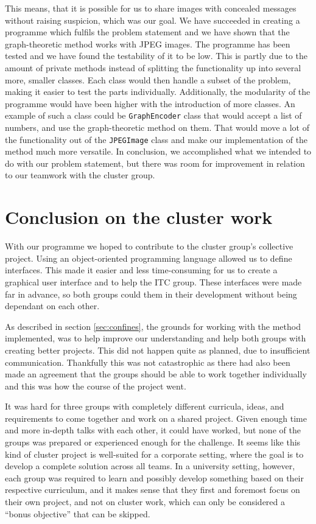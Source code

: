 This means, that it is possible for us to share images with concealed messages without raising suspicion, which was our goal.
We have succeeded in creating a programme which fulfils the problem statement and we have shown that the graph-theoretic method works with JPEG images. 
The programme has been tested and we have found the testability of it to be low. 
This is partly due to the amount of private methods instead of splitting the functionality up into several more, smaller classes. 
Each class would then handle a subset of the problem, making it easier to test the parts individually. 
Additionally, the modularity of the programme would have been higher with the introduction of more classes.
An example of such a class could be \lstinline|GraphEncoder| class that would accept a list of numbers, and use the graph-theoretic method on them. 
That would move a lot of the functionality out of the \lstinline|JPEGImage| class and make our implementation of the method much more versatile. 
In conclusion, we accomplished what we intended to do with our problem statement, but there was room for improvement in relation to our teamwork with the cluster group. 

\section{Conclusion on the cluster work}

With our programme we hoped to contribute to the cluster group's collective project.
Using an object-oriented programming language allowed us to define interfaces. This made it easier and less time-consuming for us to create a graphical user interface and to help the ITC group.
These interfaces were made far in advance, so both groups could them in their development without being dependant on each other.

As described in section \ref{sec:confines}, the grounds for working with the method implemented, was to help improve our understanding and help both groups with creating better projects. 
This did not happen quite as planned, due to insufficient communication.
Thankfully this was not catastrophic as there had also been made an agreement that the groups should be able to work together individually and this was how the course of the project went.

It was hard for three groups with completely different curricula, ideas, and requirements to come together and work on a shared project.
Given enough time and more in-depth talks with each other, it could have worked, but none of the groups was prepared or experienced enough for the challenge.
It seems like this kind of cluster project is well-suited for a corporate setting, where the goal is to develop a complete solution across all teams.
In a university setting, however, each group was required to learn and possibly develop something based on their respective curriculum, and it makes sense that they first and foremost focus on their own project, and not on cluster work, which can only be considered a ``bonus objective'' that can be skipped.

